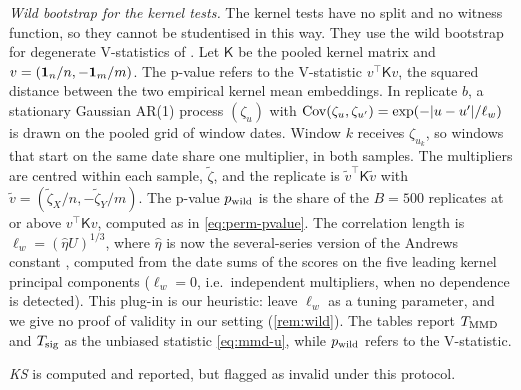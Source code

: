 \emph{Wild bootstrap for the kernel tests.} The kernel tests have no split and no witness
function, so they cannot be studentised in this way. They use the wild bootstrap for degenerate
V-statistics of \citet{chwialkowski2014wild}. Let $\mathsf K$ be the pooled kernel matrix and
$v=(\mathbf{1}_n/n,-\mathbf{1}_m/m)$. The p-value refers to the V-statistic $v^\top\mathsf Kv$, the squared
distance between the two empirical kernel mean embeddings. In replicate $b$, a stationary
Gaussian AR(1) process $(\zeta_u)$ with $\operatorname{Cov}(\zeta_u,\zeta_{u'})=\exp(-\lvert u-u'\rvert/\ell_w)$ is
drawn on the pooled grid of window dates. Window $k$ receives $\zeta_{u_k}$, so windows that
start on the same date share one multiplier, in both samples. The multipliers are centred
within each sample, $\tilde\zeta$, and the replicate is $\tilde v^\top\mathsf K\tilde v$ with
$\tilde v=(\tilde\zeta_X/n,-\tilde\zeta_Y/m)$. The p-value $p_{\mathrm{wild}}$ is the share of the
$B=500$ replicates at or above $v^\top\mathsf Kv$, computed as in \eqref{eq:perm-pvalue}. The
correlation length is $\ell_w=(\hat\eta U)^{1/3}$, where $\hat\eta$ is now the several-series
version of the Andrews constant \citep{andrews1991heteroskedasticity}, computed from the date
sums of the scores on the five leading kernel principal components ($\ell_w=0$, i.e.\
independent multipliers, when no dependence is detected). This plug-in is our heuristic:
\citet{chwialkowski2014wild} leave $\ell_w$ as a tuning parameter, and we give no proof of
validity in our setting (\cref{rem:wild}). The tables report $T_{\mathrm{MMD}}$ and $T_{\mathrm{sig}}$ as the
unbiased statistic \eqref{eq:mmd-u}, while $p_{\mathrm{wild}}$ refers to the V-statistic.

\emph{KS} is computed and reported, but flagged as invalid under this protocol.


